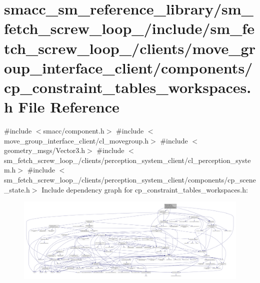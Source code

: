 \hypertarget{sm__fetch__screw__loop__1_2include_2sm__fetch__screw__loop__1_2clients_2move__group__interface__eb937614fd7247d7c9113c75427badb8}{}\section{smacc\+\_\+sm\+\_\+reference\+\_\+library/sm\+\_\+fetch\+\_\+screw\+\_\+loop\+\_/include/sm\+\_\+fetch\+\_\+screw\+\_\+loop\+\_/clients/move\+\_\+group\+\_\+interface\+\_\+client/components/cp\+\_\+constraint\+\_\+tables\+\_\+workspaces.h File Reference}
\label{sm__fetch__screw__loop__1_2include_2sm__fetch__screw__loop__1_2clients_2move__group__interface__eb937614fd7247d7c9113c75427badb8}
{\ttfamily \#include $<$smacc/component.\+h$>$}\newline
{\ttfamily \#include $<$move\+\_\+group\+\_\+interface\+\_\+client/cl\+\_\+movegroup.\+h$>$}\newline
{\ttfamily \#include $<$geometry\+\_\+msgs/\+Vector3.\+h$>$}\newline
{\ttfamily \#include $<$sm\+\_\+fetch\+\_\+screw\+\_\+loop\+\_/clients/perception\+\_\+system\+\_\+client/cl\+\_\+perception\+\_\+system.\+h$>$}\newline
{\ttfamily \#include $<$sm\+\_\+fetch\+\_\+screw\+\_\+loop\+\_/clients/perception\+\_\+system\+\_\+client/components/cp\+\_\+scene\+\_\+state.\+h$>$}\newline
Include dependency graph for cp\+\_\+constraint\+\_\+tables\+\_\+workspaces.\+h\+:
\nopagebreak
\begin{figure}[H]
\begin{center}
\leavevmode
\includegraphics[width=350pt]{sm__fetch__screw__loop__1_2include_2sm__fetch__screw__loop__1_2clients_2move__group__interface__45de4206716bc3fdd1884bf9ce08b22a}
\end{center}
\end{figure}
